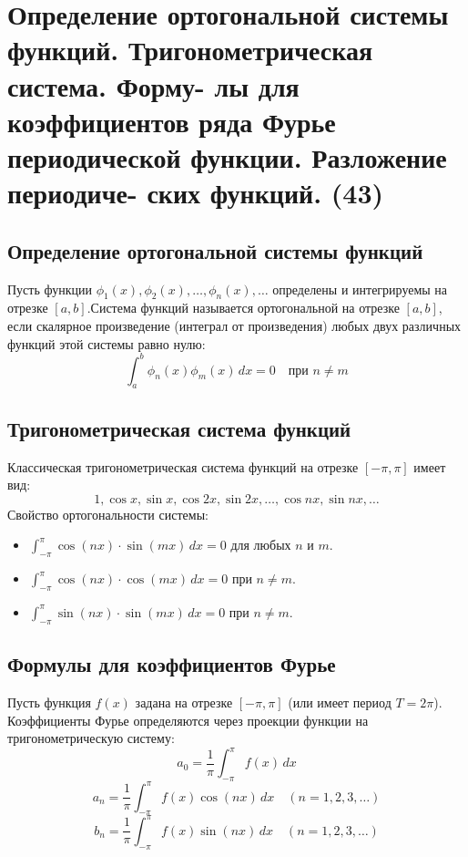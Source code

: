 \documentclass[14pt]{extreport}
\begin{document}
    \chapter{Определение ортогональной системы функций. Тригонометрическая система. Форму-
лы для коэффициентов ряда Фурье периодической функции. Разложение периодиче-
ских функций. (43)}

    \section{Определение ортогональной системы функций}

    \begin{definition}
        Пусть функции $\phi_1(x), \phi_2(x), \dots, \phi_n(x), \dots$ определены и интегрируемы на отрезке $[a, b]$.Система функций называется ортогональной на отрезке $[a, b]$, если скалярное произведение (интеграл от произведения) любых двух различных функций этой системы равно нулю:$$\int_a^b \phi_n(x) \phi_m(x) \, dx = 0 \quad \text{при } n \neq m$$
    \end{definition}


    \section{Тригонометрическая система функций}
        Классическая тригонометрическая система функций на отрезке $[-\pi, \pi]$ имеет вид:$$1, \cos x, \sin x, \cos 2x, \sin 2x, \dots, \cos nx, \sin nx, \dots$$
        Свойство ортогональности системы:
        \begin{itemize}
            \item $\int_{-\pi}^{\pi} \cos(nx) \cdot \sin(mx) \, dx = 0$ для любых $n$ и $m$.
            \item $\int_{-\pi}^{\pi} \cos(nx) \cdot \cos(mx) \, dx = 0$ при $n \neq m$.
            \item $\int_{-\pi}^{\pi} \sin(nx) \cdot \sin(mx) \, dx = 0$ при $n \neq m$.
        \end{itemize}

    \section{Формулы для коэффициентов Фурье}
    Пусть функция $f(x)$ задана на отрезке $[-\pi, \pi]$ (или имеет период $T = 2\pi$). Коэффициенты Фурье определяются через проекции функции на тригонометрическую систему:$$a_0 = \frac{1}{\pi} \int_{-\pi}^{\pi} f(x) \, dx$$$$a_n = \frac{1}{\pi} \int_{-\pi}^{\pi} f(x) \cos(nx) \, dx \quad (n = 1, 2, 3, \dots)$$$$b_n = \frac{1}{\pi} \int_{-\pi}^{\pi} f(x) \sin(nx) \, dx \quad (n = 1, 2, 3, \dots)$$
\end{document}
